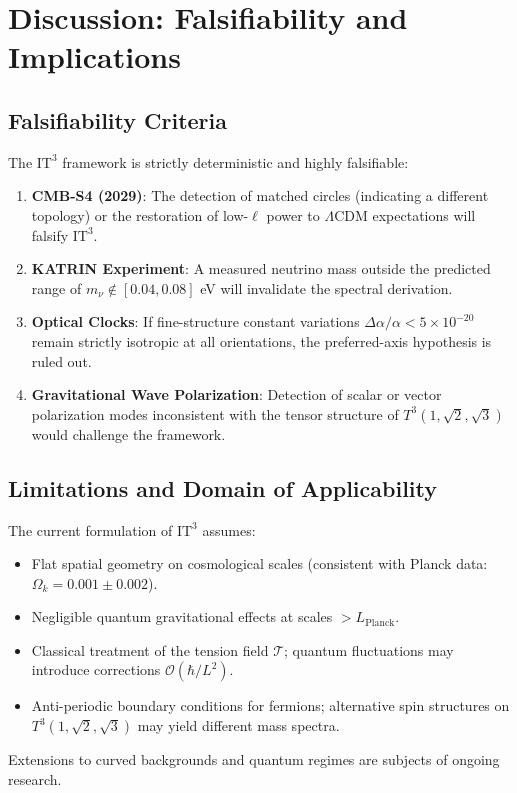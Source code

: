 \documentclass[12pt,a4paper,oneside]{article}
\theoremstyle{plain}
\theoremstyle{definition}
\theoremstyle{remark}
\newcommand{\ITthree}{\mathrm{IT}^3}
\newcommand{\Tthree}{T^3(1,\sqrt{2},\sqrt{3})}
\newcommand{\tension}{\mathcal{T}}
\newcommand{\hbarred}{\hbar}
\begin{document}
\section{Discussion: Falsifiability and Implications}
\label{sec:discussion}

\subsection{Falsifiability Criteria}
The \texorpdfstring{$\ITthree$}{IT3} framework is strictly deterministic and highly falsifiable:
\begin{enumerate}
    \item \textbf{CMB-S4 (2029)}: The detection of matched circles (indicating a different topology) or the restoration of low-$\ell$ power to $\Lambda$CDM expectations will falsify \texorpdfstring{$\ITthree$}{IT3}.
    \item \textbf{KATRIN Experiment}: A measured neutrino mass outside the predicted range of $m_\nu \notin [0.04, 0.08]$ eV will invalidate the spectral derivation.
    \item \textbf{Optical Clocks}: If fine-structure constant variations $\Delta\alpha/\alpha < 5\times10^{-20}$ remain strictly isotropic at all orientations, the preferred-axis hypothesis is ruled out.
    \item \textbf{Gravitational Wave Polarization}: Detection of scalar or vector polarization modes inconsistent with the tensor structure of $\Tthree$ would challenge the framework.
\end{enumerate}

\subsection{Limitations and Domain of Applicability}
The current formulation of \texorpdfstring{$\ITthree$}{IT3} assumes:
\begin{itemize}
    \item Flat spatial geometry on cosmological scales (consistent with Planck data: $\Omega_k = 0.001 \pm 0.002$).
    \item Negligible quantum gravitational effects at scales $> L_{\mathrm{Planck}}$.
    \item Classical treatment of the tension field $\tension$; quantum fluctuations may introduce corrections $\mathcal{O}(\hbarred/L^2)$.
    \item Anti-periodic boundary conditions for fermions; alternative spin structures on $\Tthree$ may yield different mass spectra.
\end{itemize}
Extensions to curved backgrounds and quantum regimes are subjects of ongoing research.
\end{document}
